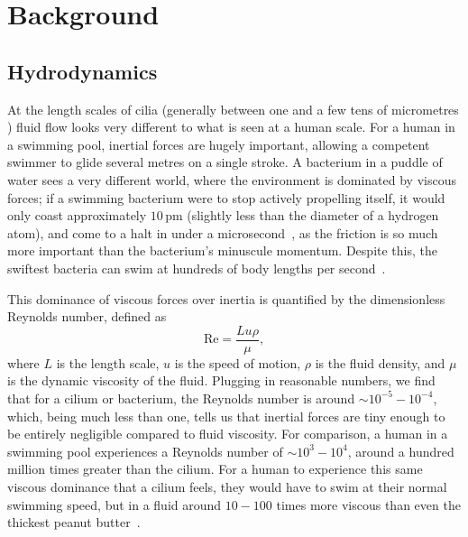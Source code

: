 \setchapterpreamble[u]{\optmargintoc}
\chapter{Background}

\section{Hydrodynamics}

At the length scales of cilia (generally between one and a few tens of micrometres ) fluid flow looks very different to what is seen at a human scale. For a human in a swimming pool, inertial forces are hugely important, allowing a competent swimmer to glide several metres on a single stroke. A bacterium in a puddle of water sees a very different world, where the environment is dominated by viscous forces; if a swimming bacterium were to stop actively propelling itself, it would only coast approximately $10\,\mathrm{pm}$ (slightly less than the diameter of a hydrogen atom), and come to a halt in under a microsecond~, as the friction is so much more important than the bacterium's minuscule momentum. Despite this, the swiftest bacteria can swim at hundreds of body lengths per second~.

This dominance of viscous forces over inertia is quantified by the dimensionless Reynolds number, defined as
\begin{equation}
    \mathrm{Re} = \frac{L u \rho}{\mu},
\end{equation}
where $L$ is the length scale, $u$ is the speed of motion, $\rho$ is the fluid density, and $\mu$ is the dynamic viscosity of the fluid.
Plugging in reasonable numbers, we find that for a cilium or bacterium, the Reynolds number is around $\sim 10^{-5} - 10^{-4}$, which, being much less than one, tells us that inertial forces are tiny enough to be entirely negligible compared to fluid viscosity. For comparison, a human in a swimming pool experiences a Reynolds number of $\sim 10^3 - 10^4$, around a hundred million times greater than the cilium. For a human to experience this same viscous dominance that a cilium feels, they would have to swim at their normal swimming speed, but in a fluid around $10 - 100$ times more viscous than even the thickest peanut butter~.

